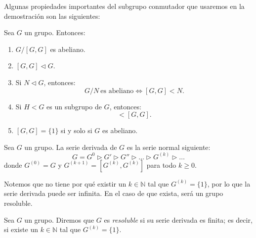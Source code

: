 \begin{ejercicio}
    Algunas propiedades importantes del subgrupo conmutador que usaremos en la demostración son las siguientes:
    \begin{prop}
        Sea \(G\) un grupo. Entonces:
        \begin{enumerate}
            \item \(G/[G, G]\) es abeliano.
            \item $[G, G]\lhd G$.
            \item Si \(N\lhd G\), entonces:
            \begin{equation*}
                G/N\ \text{es abeliano} \iff [G, G] < N.
            \end{equation*}
            \item Si $H<G$ es un subgrupo de \(G\), entonces:
            \begin{equation*}
                [H, H] < [G, G].
            \end{equation*}
            \item $[G, G]=\{1\}$ si y solo si \(G\) es abeliano.
        \end{enumerate}
    \end{prop}

    \begin{definicion}
        Sea \(G\) un grupo. La serie derivada de \(G\) es la serie normal siguiente:
        \begin{equation*}
            G = G^0 \rhd G' \rhd G'' \rhd \ldots \rhd G^{(k)} \rhd \ldots
        \end{equation*}
        donde \(G^{(0)} = G\) y \(G^{(k+1)} = [G^{(k)}, G^{(k)}]\) para todo \(k\geq 0\).
    \end{definicion}

    Notemos que no tiene por qué existir un $k\in \mathbb{N}$ tal que \(G^{(k)} = \{1\}\), por lo que la serie derivada puede ser infinita. En el caso de que exista, será un grupo resoluble.
    \begin{definicion}
        Sea \(G\) un grupo. Diremos que \(G\) es \emph{resoluble} si su serie derivada es finita; es decir, si existe un \(k\in \mathbb{N}\) tal que \(G^{(k)} = \{1\}\).
    \end{definicion}


\end{ejercicio}
